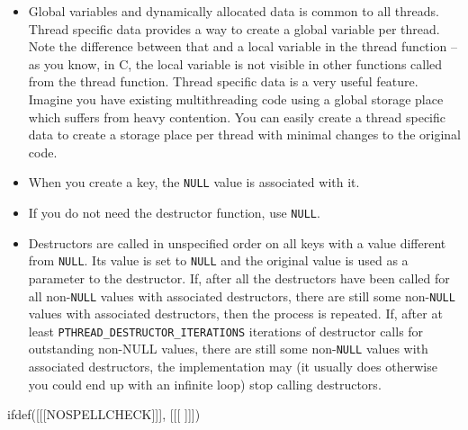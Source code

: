 \begin{itemize}
\item \label{THREAD_SPECIFIC_DATA} Global variables and dynamically
allocated data is common to all threads.  Thread specific data provides a way to
create a global variable per thread.  Note the difference between that and a
local variable in the thread function -- as you know, in C, the local variable
is not visible in other functions called from the thread function.  Thread
specific data is a very useful feature.  Imagine you have existing
multithreading code using a global storage place which suffers from heavy
contention.  You can easily create a thread specific data to create a storage
place per thread with minimal changes to the original code.
\item When you create a key, the \texttt{NULL} value is associated with it.
\item If you do not need the destructor function, use \texttt{NULL}.
\item Destructors are called in unspecified order on all keys with a value
different from \texttt{NULL}.  Its value is set to \texttt{NULL} and the
original value is used as a parameter to the destructor.  If, after all the
destructors have been called for all non-\texttt{NULL} values with associated
destructors, there are still some non-\texttt{NULL} values with associated
destructors, then the process is repeated.  If, after at least
\texttt{PTHREAD\_DESTRUCTOR\_ITERATIONS} iterations of destructor calls for
outstanding non-NULL values, there are still some non-\texttt{NULL} values with
associated destructors, the implementation may (it usually does otherwise you
could end up with an infinite loop) stop calling destructors.
\end{itemize}


ifdef([[[NOSPELLCHECK]]], [[[
]]])

